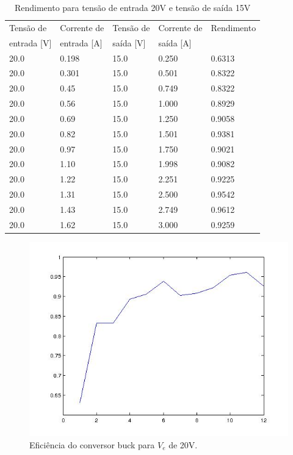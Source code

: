 \begin{small}
	\begin{table}[H]
		\begin{center}
			\caption{Rendimento para tensão de entrada 20V e tensão de saída 15V}
			\begin{tabular}{l|l|l|l|l}
				\hline
				Tensão de & Corrente de & Tensão de  & Corrente de & Rendimento\\
				entrada [V]& entrada [A] & saída [V] & saída [A] &\\
				\hline
				20.0 & 0.198 & 15.0 & 0.250  & 0.6313\\
				\hline
				20.0 & 0.301 & 15.0 & 0.501  & 0.8322\\
				\hline
				20.0 & 0.45 & 15.0 & 0.749  & 0.8322\\
				\hline
				20.0 & 0.56 & 15.0 & 1.000  & 0.8929\\
				\hline
				20.0 & 0.69 & 15.0 & 1.250  & 0.9058\\
				\hline
				20.0 & 0.82 & 15.0 & 1.501 & 0.9381\\
				\hline
				20.0 & 0.97 & 15.0 & 1.750 & 0.9021\\
				\hline
				20.0 & 1.10 & 15.0 & 1.998  & 0.9082\\
				\hline
				20.0 & 1.22 & 15.0 & 2.251  & 0.9225\\
				\hline
				20.0 & 1.31 & 15.0 & 2.500  & 0.9542\\
				\hline
				20.0 & 1.43 & 15.0 & 2.749 & 0.9612\\
				\hline
				20.0 & 1.62 & 15.0 & 3.000 & 0.9259\\
				\hline
			\end{tabular}
			\label{t_n20v}
		\end{center}
	\end{table}
\end{small}

\begin{figure}[H]
	\centering
	\includegraphics[scale=0.5]{Imagens/n20v.jpg}
	\caption{Eficiência do conversor buck para $V_e$ de 20V.}
	\label{f_n20v}
\end{figure}

